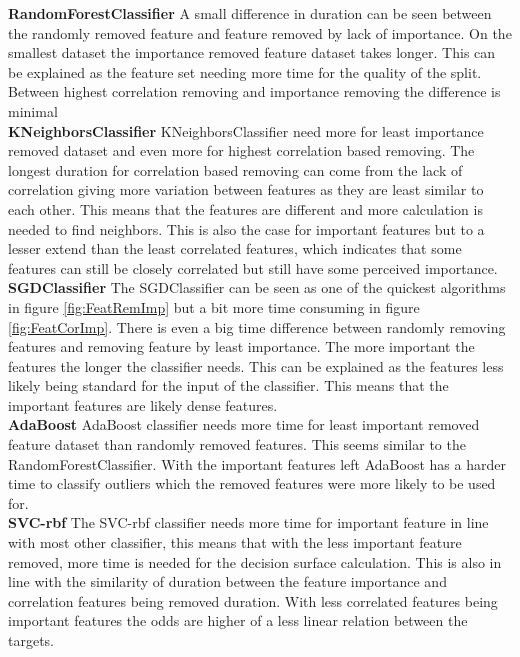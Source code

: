 \documentclass[a4paper,10pt]{article}
\begin{document}
\textbf{RandomForestClassifier} A small difference in duration can be seen between the randomly removed feature and feature removed by lack of importance. On the smallest dataset the importance removed feature dataset takes longer. This can be explained as the feature set needing more time for the quality of the split. Between highest correlation removing and importance removing the difference is minimal\\

\textbf{KNeighborsClassifier} KNeighborsClassifier need more for least importance removed dataset and even more for highest correlation based removing. The longest duration for correlation based removing can come from the lack of correlation giving more variation between features as they are least similar to each other. This means that the features are different and more calculation is needed to find neighbors. This is also the case for important features but to a lesser extend than the least correlated features, which indicates that some features can still be closely correlated but still have some perceived importance.\\

\textbf{SGDClassifier} The SGDClassifier can be seen as one of the quickest algorithms in figure \ref{fig:FeatRemImp} but a bit more time consuming in figure \ref{fig:FeatCorImp}. There is even a big time difference between randomly removing features and removing feature by least importance. The more important the features the longer the classifier needs. This can be explained as the features less likely being standard for the input of the classifier. This means that the important features are likely dense features. \\

\textbf{AdaBoost} AdaBoost classifier needs more time for least important removed feature dataset than randomly removed features. This seems similar to the RandomForestClassifier. With the important features left AdaBoost has a harder time to classify outliers which the removed features were more likely to be used for. \\

\textbf{SVC-rbf} The SVC-rbf classifier needs more time for important feature in line with most other classifier, this means that with the less important feature removed, more time is needed for the decision surface calculation. This is also in line with the similarity of duration between the feature importance and correlation features being removed duration. With less correlated features being important features the odds are higher of a less linear relation between the targets.%
 \\
\end{document}
